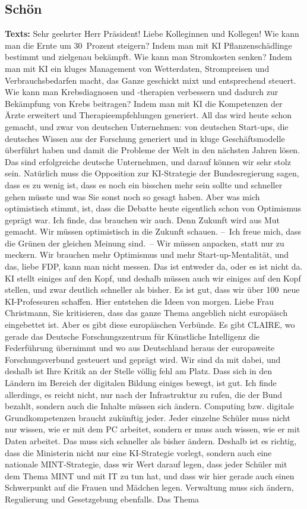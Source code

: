 \documentclass{article}
\begin{document}
\subsection{Schön}
\noindent\textbf{Texts:} Sehr geehrter Herr Präsident! Liebe Kolleginnen und Kollegen! Wie kann man die Ernte um 30 Prozent steigern? Indem man mit KI Pflanzenschädlinge bestimmt und zielgenau bekämpft. Wie kann man Stromkosten senken? Indem man mit KI ein kluges Management von Wetterdaten, Strompreisen und Verbrauchsbedarfen macht, das Ganze geschickt mixt und entsprechend steuert. Wie kann man Krebsdiagnosen und -therapien verbessern und dadurch zur Bekämpfung von Krebs beitragen? Indem man mit KI die Kompetenzen der Ärzte erweitert und Therapieempfehlungen generiert. All das wird heute schon gemacht, und zwar von deutschen Unternehmen: von deutschen Start-ups, die deutsches Wissen aus der Forschung generiert und in kluge Geschäftsmodelle überführt haben und damit die Probleme der Welt in den nächsten Jahren lösen. Das sind erfolgreiche deutsche Unternehmen, und darauf können wir sehr stolz sein.  Natürlich muss die Opposition zur KI-Strategie der Bundesregierung sagen, dass es zu wenig ist, dass es noch ein bisschen mehr sein sollte und schneller gehen müsste und was Sie sonst noch so gesagt haben. Aber was mich optimistisch stimmt, ist, dass die Debatte heute eigentlich schon von Optimismus geprägt war. Ich finde, das brauchen wir auch. Denn Zukunft wird aus Mut gemacht. Wir müssen optimistisch in die Zukunft schauen.  – Ich freue mich, dass die Grünen der gleichen Meinung sind. – Wir müssen anpacken, statt nur zu meckern. Wir brauchen mehr Optimismus und mehr Start-up-Mentalität, und das, liebe FDP, kann man nicht messen. Das ist entweder da, oder es ist nicht da. KI stellt einiges auf den Kopf, und deshalb müssen auch wir einiges auf den Kopf stellen, und zwar deutlich schneller als bisher. Es ist gut, dass wir über 100 neue KI-Professuren schaffen. Hier entstehen die Ideen von morgen. Liebe Frau Christmann, Sie kritisieren, dass das ganze Thema angeblich nicht europäisch eingebettet ist. Aber es gibt diese europäischen Verbünde. Es gibt CLAIRE, wo gerade das Deutsche Forschungszentrum für Künstliche Intelligenz die Federführung übernimmt und wo aus Deutschland heraus der europaweite Forschungsverbund gesteuert und geprägt wird. Wir sind da mit dabei, und deshalb ist Ihre Kritik an der Stelle völlig fehl am Platz.  Dass sich in den Ländern im Bereich der digitalen Bildung einiges bewegt, ist gut. Ich finde allerdings, es reicht nicht, nur nach der Infrastruktur zu rufen, die der Bund bezahlt, sondern auch die Inhalte müssen sich ändern. Computing bzw. digitale Grundkompetenzen braucht zukünftig jeder. Jeder einzelne Schüler muss nicht nur wissen, wie er mit dem PC arbeitet, sondern er muss auch wissen, wie er mit Daten arbeitet. Das muss sich schneller als bisher ändern. Deshalb ist es richtig, dass die Ministerin nicht nur eine KI-Strategie vorlegt, sondern auch eine nationale MINT-Strategie, dass wir Wert darauf legen, dass jeder Schüler mit dem Thema MINT und mit IT zu tun hat, und dass wir hier gerade auch einen Schwerpunkt auf die Frauen und Mädchen legen.  Verwaltung muss sich ändern, Regulierung und Gesetzgebung ebenfalls. Das Thema 
\end{document}
